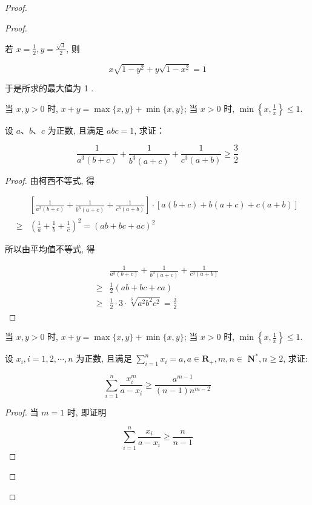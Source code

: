 \begin{proof}
\begin{example}
\begin{solution}
\begin{note}
\begin{solution}
\begin{proof}
\begin{solution}
	若 $x=\frac{1}{2}, y=\frac{\sqrt{3}}{2}$, 则
	
	$$
	x \sqrt{1-y^{2}}+y \sqrt{1-x^{2}}=1
	$$
	
	于是所求的最大值为 1 .
\end{solution}
\begin{note}
	当 $x, y>0$ 时, $x+y=\max \{x, y\}+\min \{x, y\}$; 当 $x>0$ 时, $\min \left\{x, \frac{1}{x}\right\} \leqslant 1$.
\end{note}

\begin{example}
	设 $a 、 b 、 c$ 为正数, 且满足 $a b c=1$, 求证：
	
	$$
	\frac{1}{a^{3}(b+c)}+\frac{1}{b^{3}(a+c)}+\frac{1}{c^{3}(a+b)} \geqslant \frac{3}{2}
	$$
\end{example}
\begin{proof}
	由柯西不等式, 得
	
	$$
	\begin{aligned}
	& {\left[\frac{1}{a^{3}(b+c)}+\frac{1}{b^{3}(a+c)}+\frac{1}{c^{3}(a+b)}\right] \cdot[a(b+c)+b(a+c)+c(a+b)] } \\
	\geqslant & \left(\frac{1}{a}+\frac{1}{b}+\frac{1}{c}\right)^{2}=(a b+b c+a c)^{2}
	\end{aligned}
	$$
	
	所以由平均值不等式, 得
	
	$$
	\begin{aligned}
	& \frac{1}{a^{3}(b+c)}+\frac{1}{b^{3}(a+c)}+\frac{1}{c^{3}(a+b)} \\
	\geqslant & \frac{1}{2}(a b+b c+c a) \\
	\geqslant & \frac{1}{2} \cdot 3 \cdot \sqrt[3]{a^{2} b^{2} c^{2}}=\frac{3}{2}
	\end{aligned}
	$$
\end{proof}
\begin{note}
	当 $x, y>0$ 时, $x+y=\max \{x, y\}+\min \{x, y\}$; 当 $x>0$ 时, $\min \left\{x, \frac{1}{x}\right\} \leqslant 1$.
\end{note}

\begin{example}
	设 $x_{i}, i=1,2, \cdots, n$ 为正数, 且满足 $\sum_{i=1}^{n} x_{i}=a, a \in \mathbf{R}_{+}, m, n \in$ $\mathbf{N}^{*}, n \geqslant 2$, 求证:
	
	$$
	\sum_{i=1}^{n} \frac{x_{i}^{m}}{a-x_{i}} \geqslant \frac{a^{m-1}}{(n-1) n^{m-2}}
	$$
\end{example}
\begin{proof}
	当 $m=1$ 时, 即证明
	
	$$
	\sum_{i=1}^{n} \frac{x_{i}}{a-x_{i}} \geqslant \frac{n}{n-1}
	$$
	

\end{proof}
\end{proof}
\end{solution}
\end{note}
\end{solution}
\end{example}
\end{proof}
